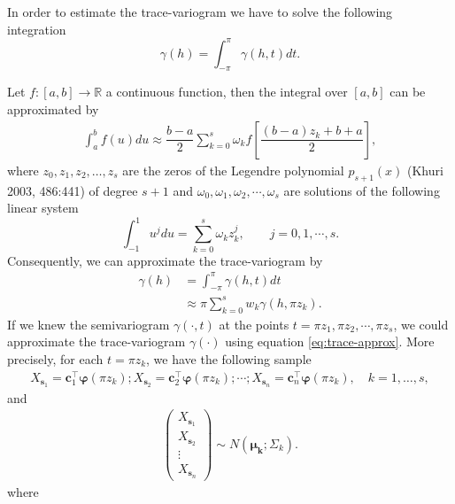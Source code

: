 \documentclass[12pt,]{article}
\theoremstyle{definition}
\theoremstyle{definition}
\theoremstyle{definition}
\theoremstyle{remark}
\begin{document}
In order to estimate the trace-variogram we have to solve the following integration
\begin{equation}
\gamma(h) = \int_{-\pi}^{\pi} \gamma(h,t) dt.
\label{eq:trace-variogram}
\end{equation}

Let \(f:[a,b] \longrightarrow \mathbb{R}\) a continuous function, then the integral over \([a,b]\) can be approximated by
\begin{align*}
\int_{a}^{b} f(u) du \approx \dfrac{b-a}{2} \sum_{k=0}^{s} \omega_k f \left[\dfrac{(b-a)z_k + b +a}{2}\right],
\end{align*}
where \(z_0,z_1, z_2, \dots, z_s\) are the zeros of the Legendre polynomial \(p_{s+1}(x)\) (Khuri 2003, 486:441) of degree \(s + 1\) and \(\omega_0,\omega_1, \omega_2, \cdots, \omega_s\) are solutions of the following linear system
\begin{equation*}
\int_{-1}^{1} u^j du= \sum_{k=0}^{s} \omega_k z_k^j, \qquad j=0,1, \cdots, s.
\end{equation*}
Consequently, we can approximate the trace-variogram by
\begin{align}
\nonumber \gamma(h) &= \int_{-\pi}^{\pi} \gamma(h, t)dt \\
&\approx  \pi \sum_{k=0}^{s} w_k \gamma \left( h, \pi z_k \right).
\label{eq:trace-approx}
\end{align}
If we knew the semivariogram \(\gamma(\cdot,t)\) at the points \(t=\pi z_1, \pi z_2, \cdots, \pi z_s\), we could approximate the trace-variogram \(\gamma(\cdot)\) using equation \eqref{eq:trace-approx}. More precisely, for each \(t=\pi z_k\), we have the following sample
\begin{align*}
 X_{\bm{s}_1} = \bm{c}_1^\top \bm{\varphi}(\pi z_k); X_{\bm{s}_2} = \bm{c}_2^\top \bm{\varphi}(\pi z_k); \cdots; X_{\bm{s}_n} = \bm{c}_n^\top \bm{\varphi}(\pi z_k), \quad k=1, \dots, s,
\end{align*}
and
\begin{align*}
 \begin{pmatrix}
  X_{\bm{s}_1}\\
  X_{\bm{s}_2}\\
  \vdots\\
  X_{\bm{s}_n}
 \end{pmatrix}
\sim N\left(\bm{\mu_k};\Sigma_k \right).
\end{align*}
where
\end{document}
